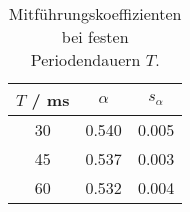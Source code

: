 \begin{table}[H]
\caption{Mitf\"uhrungskoeffizienten bei festen Periodendauern $T$. }
\begin{center}
\begin{tabular}{|c|c|c|}
  \hline
  $T$ / ms & $\alpha$ & $s_{\alpha}$ \\ \hline
  30 & 0.540 & 0.005 \\ \hline
  45 & 0.537 & 0.003 \\ \hline
  60 & 0.532 & 0.004 \\ \hline
\end{tabular}
\end{center}
\label{tab:x0:alpha}
\end{table}
